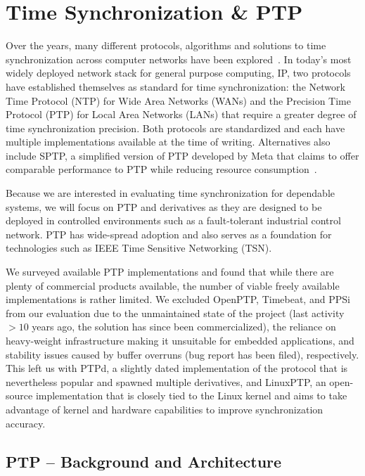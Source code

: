 
\section{Time Synchronization \& PTP}

Over the years, many different protocols, algorithms and solutions to time synchronization across computer networks have been explored~\cite{ntpv4-spec, sntp-spec, linuxptp}. In today's most widely deployed network stack for general purpose computing, IP, two protocols have established themselves as standard for time synchronization: the Network Time Protocol (NTP) for Wide Area Networks (WANs) and the Precision Time Protocol (PTP) for Local Area Networks (LANs) that require a greater degree of time synchronization precision. Both protocols are standardized and each have multiple implementations available at the time of writing. Alternatives also include SPTP, a simplified version of PTP developed by Meta that claims to offer comparable performance to PTP while reducing resource consumption~\cite{sptp}.

Because we are interested in evaluating time synchronization for dependable systems, we will focus on PTP and derivatives as they are designed to be deployed in controlled environments such as a fault-tolerant industrial control network. PTP has wide-spread adoption and also serves as a foundation for technologies such as IEEE Time Sensitive Networking (TSN).

We surveyed available PTP implementations and found that while there are plenty of commercial products available, the number of viable freely available implementations is rather limited. We excluded OpenPTP, Timebeat, and PPSi from our evaluation due to the unmaintained state of the project (last activity $>10$ years ago, the solution has since been commercialized), the reliance on heavy-weight infrastructure making it unsuitable for embedded applications, and stability issues caused by buffer overruns (bug report has been filed), respectively. This left us with PTPd, a slightly dated implementation of the protocol that is nevertheless popular and spawned multiple derivatives, and LinuxPTP, an open-source implementation that is closely tied to the Linux kernel and aims to take advantage of kernel and hardware capabilities to improve synchronization accuracy.

\subsection{PTP -- Background and Architecture}

